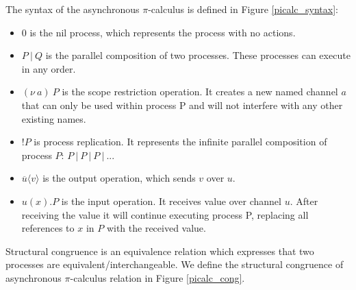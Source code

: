 \documentclass[12pt,twoside]{report}
\begin{document}
The syntax of the asynchronous $\pi$-calculus is defined in Figure \ref{picalc_syntax}:
\begin{itemize}
    \item $0$ is the nil process, which represents the process with no actions.
    \item $P\ |\ Q$ is the parallel composition of two processes. These processes can execute in any order.
    \item $(\nu\ a)\ P$ is the scope restriction operation. It creates a new named channel $a$ that can only be used within process P and will not interfere with any other existing names.
    \item $!P$ is process replication. It represents the infinite parallel composition of process $P$: $P\ |\ P\ |\ P\ |\ ...$
    \item $\overline{u}\langle v \rangle$ is the output operation, which sends $v$ over $u$.
    \item $u(x).P$ is the input operation. It receives value over channel $u$. After receiving the value  it will continue executing process P, replacing all references to $x$ in $P$ with the received value.
\end{itemize}

Structural congruence is an equivalence relation which expresses that two processes are equivalent/interchangeable. We define the structural congruence of asynchronous $\pi$-calculus relation in Figure \ref{picalc_cong}.\\
\end{document}
